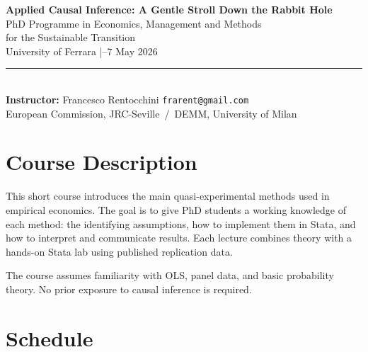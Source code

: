 \documentclass[11pt, a4paper]{article}
\begin{document}

\begin{center}
  {\LARGE\bfseries\color{ecnavy}
    Applied Causal Inference: A Gentle Stroll Down the Rabbit Hole}\\[6pt]
  {\large\color{ecblue}
    PhD Programme in Economics, Management and Methods\\
    for the Sustainable Transition}\\[4pt]
  {\normalsize\color{ecgray}
    University of Ferrara \quad|--7 May 2026}\\[10pt]
  \rule{\linewidth}{1.5pt}\\[6pt]
  {\small
    \textbf{Instructor:} Francesco Rentocchini \quad
    \texttt{frarent@gmail.com}\\
    European Commission, JRC-Seville \,/\,
    DEMM, University of Milan
  }
\end{center}

\vspace{0.5em}

\section*{Course Description}

This short course introduces the main quasi-experimental methods used
in empirical economics. The goal is to give PhD students a working
knowledge of each method: the identifying assumptions, how to implement
them in Stata, and how to interpret and communicate results. Each lecture
combines theory with a hands-on Stata lab using published replication data.

The course assumes familiarity with OLS, panel data, and basic
probability theory. No prior exposure to causal inference is required.

\section*{Schedule}
\end{document}
